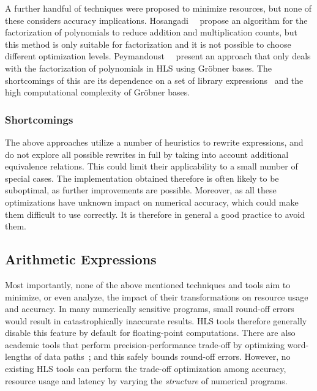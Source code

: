 A further handful of techniques were proposed to minimize resources, but none
of these considers accuracy implications.  Hosangadi~\etal~\cite{hosangadi}
propose an algorithm for the factorization of polynomials to reduce
addition and multiplication counts, but this method is only suitable for
factorization and it is not possible to choose different optimization
levels. Peymandoust~\etal~\cite{peymandoust} present an approach that
only deals with the factorization of polynomials in HLS using Gr{\"o}bner
bases. The shortcomings of this are its dependence on a set of library
expressions~\cite{hosangadi} and the high computational complexity of
Gr{\"o}bner bases.


\subsubsection{Shortcomings}

The above approaches utilize a number of heuristics to rewrite expressions, and
do not explore all possible rewrites in full by taking into account additional
equivalence relations.  This could limit their applicability to a small number
of special cases.  The implementation obtained therefore is often likely to
be suboptimal, as further improvements are possible.  Moreover, as all these
optimizations have unknown impact on numerical accuracy, which could make them
difficult to use correctly.  It is therefore in general a good practice to
avoid them.


\subsection{Arithmetic Expressions}
\label{bg:sub:arithmetic_expressions}

Most importantly, none of the above mentioned techniques and tools aim to
minimize, or even analyze, the impact of their transformations on resource
usage and accuracy. In many numerically sensitive programs, small round-off
errors would result in catastrophically inaccurate results.  HLS tools
therefore generally disable this feature by default for floating-point
computations.  There are also academic tools that perform precision-performance
trade-off by optimizing word-lengths of data paths~\cite{constantinides};
and this safely bounds round-off errors.  However, no existing HLS tools can
perform the trade-off optimization among accuracy, resource usage and latency
by varying the \emph{structure} of numerical programs.

